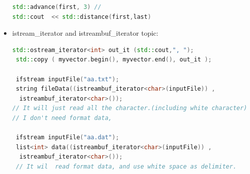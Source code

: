 \documentclass[a4paper,11pt,twoside]{book}
\begin{document}
\begin{itemize}
\begin{lstlisting}[frame=single, language=c++]
std::advance(first, 3) //
std::cout  << std::distance(first,last)
\end{lstlisting}


\item istream\_iterator and istreambuf\_iterator topic:
\begin{lstlisting}[frame=single, language=c++]
 std::ostream_iterator<int> out_it (std::cout,", ");
 std::copy ( myvector.begin(), myvector.end(), out_it );

 ifstream inputFile("aa.txt");
 string fileData((istreambuf_iterator<char>(inputFile)) ,
  istreambuf_iterator<char>());
// It will just read all the character.(including white character)
// I don't need format data,

 ifstream inputFile("aa.dat");
 list<int> data((istreambuf_iterator<char>(inputFile)) ,
  istreambuf_iterator<char>());
 // It wil  read format data, and use white space as delimiter.
\end{lstlisting}

\end{itemize}
\end{document}
